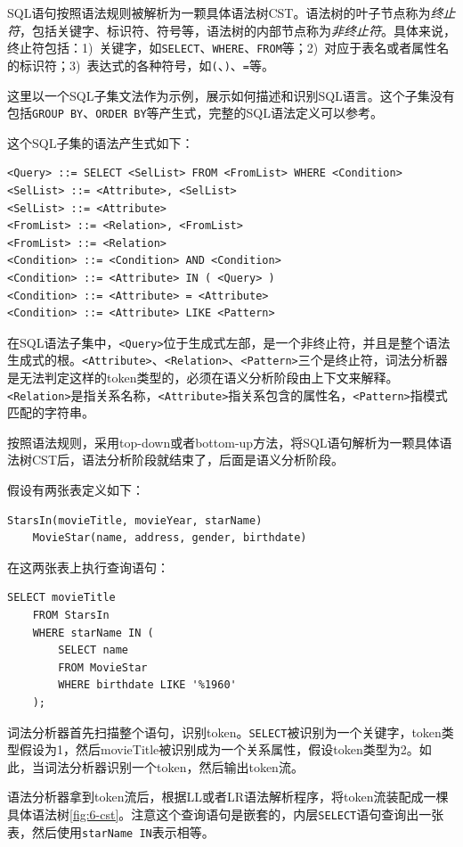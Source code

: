SQL语句按照语法规则被解析为一颗具体语法树CST。语法树的叶子节点称为\emph{终止符}，包括关键字、标识符、符号等，语法树的内部节点称为\emph{非终止符}。具体来说，终止符包括：1)~关键字，如\texttt{SELECT}、\texttt{WHERE}、\texttt{FROM}等；2)~对应于表名或者属性名的标识符；3)~表达式的各种符号，如\texttt{(}、\texttt{)}、\texttt{=}等。

这里以一个SQL子集文法作为示例，展示如何描述和识别SQL语言。这个子集没有包括\texttt{GROUP BY}、\texttt{ORDER BY}等产生式，完整的SQL语法定义可以参考\cite{SQLSynta19:online}。

这个SQL子集的语法产生式如下：

\begin{lstlisting}[style=verbose]
<Query> ::= SELECT <SelList> FROM <FromList> WHERE <Condition>
<SelList> ::= <Attribute>, <SelList>
<SelList> ::= <Attribute>
<FromList> ::= <Relation>, <FromList>
<FromList> ::= <Relation>
<Condition> ::= <Condition> AND <Condition>
<Condition> ::= <Attribute> IN ( <Query> )
<Condition> ::= <Attribute> = <Attribute>
<Condition> ::= <Attribute> LIKE <Pattern>
\end{lstlisting}

在SQL语法子集中，\texttt{<Query>}位于生成式左部，是一个非终止符，并且是整个语法生成式的根。\texttt{<Attribute>}、\texttt{<Relation>}、\texttt{<Pattern>}三个是终止符，词法分析器是无法判定这样的token类型的，必须在语义分析阶段由上下文来解释。\texttt{<Relation>}是指关系名称，\texttt{<Attribute>}指关系包含的属性名，\texttt{<Pattern>}指模式匹配的字符串。

按照语法规则，采用top-down或者bottom-up方法，将SQL语句解析为一颗具体语法树CST后，语法分析阶段就结束了，后面是语义分析阶段。

\begin{example}\label{exp:6-cst}
    假设有两张表定义如下：
\begin{lstlisting}[style=verbose]
    StarsIn(movieTitle, movieYear, starName)
    MovieStar(name, address, gender, birthdate)
\end{lstlisting}
在这两张表上执行查询语句：
\begin{lstlisting}[style=verbose]
    SELECT movieTitle
    FROM StarsIn
    WHERE starName IN (
        SELECT name
        FROM MovieStar
        WHERE birthdate LIKE '%1960'
    );
\end{lstlisting}
词法分析器首先扫描整个语句，识别token。\texttt{SELECT}被识别为一个关键字，token类型假设为1，然后movieTitle被识别成为一个关系属性，假设token类型为2。如此，当词法分析器识别一个token，然后输出token流。

语法分析器拿到token流后，根据LL或者LR语法解析程序，将token流装配成一棵具体语法树\figurename\ref{fig:6-cst}。注意这个查询语句是嵌套的，内层\texttt{SELECT}语句查询出一张表，然后使用\texttt{starName IN}表示相等。
\end{example}

